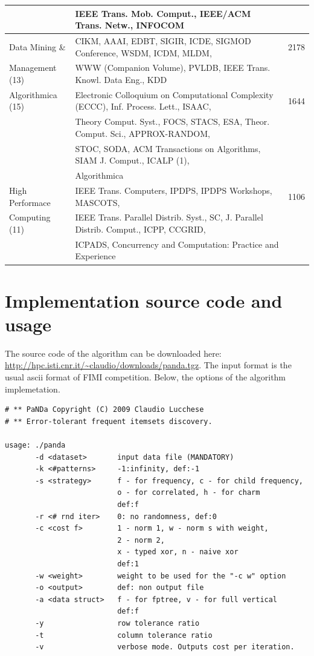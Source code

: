 \documentclass{article}
\begin{document}
\begin{table}
\begin{tabular}{l l c}
& IEEE Trans. Mob. Comput.,  IEEE/ACM Trans. Netw.,  INFOCOM & \\
%
\hline
Data Mining \& 
& CIKM,  AAAI,  EDBT,  SIGIR,  ICDE,  SIGMOD Conference,  WSDM,  ICDM,  MLDM,    &
2178
\\
Management (13) & WWW (Companion Volume),  PVLDB, IEEE Trans. Knowl. Data Eng.,  KDD & \\
%
\hline
Algorithmica (15)
&
Electronic Colloquium on Computational Complexity (ECCC),  Inf. Process. Lett.,  ISAAC,  &
1644
\\
&   Theory Comput. Syst., FOCS,  STACS,  ESA,  Theor. Comput. Sci.,  APPROX-RANDOM,    & \\
&   STOC,  SODA, ACM Transactions on Algorithms, SIAM J. Comput.,  ICALP (1),   & \\
& Algorithmica & \\
\hline
High Performace 
&
IEEE Trans. Computers,  IPDPS,  IPDPS Workshops,   MASCOTS,  
&
1106
\\
Computing (11) & IEEE Trans. Parallel Distrib. Syst.,  SC,  J. Parallel Distrib. Comput.,  ICPP,  CCGRID,   & \\
& ICPADS, Concurrency and Computation: Practice and Experience & \\
\hline
\end{tabular}
\end{table}

\section{Implementation source code and usage}
\label{sec:usage}

The source code of the algorithm can be downloaded here: \url{http://hpc.isti.cnr.it/~claudio/downloads/panda.tgz}.
The input format is the usual ascii format of FIMI competition. Below, the options of the algorithm implemetation.

\begin{verbatim}
# ** PaNDa Copyright (C) 2009 Claudio Lucchese
# ** Error-tolerant frequent itemsets discovery.

usage: ./panda
       -d <dataset>       input data file (MANDATORY)
       -k <#patterns>     -1:infinity, def:-1
       -s <strategy>      f - for frequency, c - for child frequency,
                          o - for correlated, h - for charm
                          def:f
       -r <# rnd iter>    0: no randomness, def:0
       -c <cost f>        1 - norm 1, w - norm s with weight,
                          2 - norm 2,
                          x - typed xor, n - naive xor
                          def:1
       -w <weight>        weight to be used for the "-c w" option
       -o <output>        def: non output file
       -a <data struct>   f - for fptree, v - for full vertical
                          def:f
       -y                 row tolerance ratio
       -t                 column tolerance ratio
       -v                 verbose mode. Outputs cost per iteration.
\end{verbatim}
\end{document}
